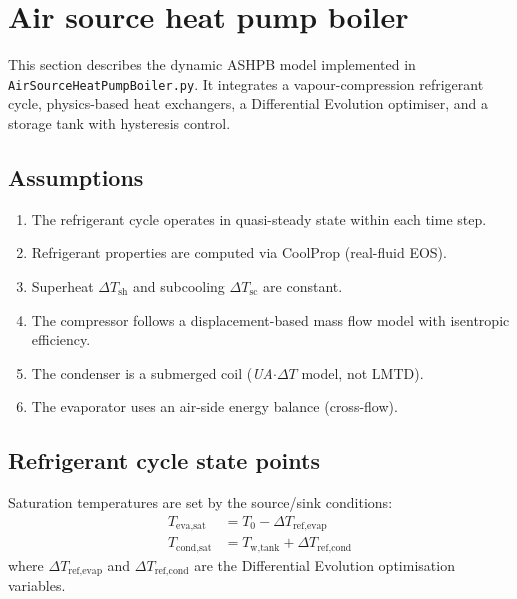 \section{Air source heat pump boiler}
\label{sec:ashpb}

This section describes the dynamic ASHPB model implemented in \texttt{AirSourceHeatPumpBoiler.py}. It integrates a vapour-compression refrigerant cycle, physics-based heat exchangers, a Differential Evolution optimiser, and a storage tank with hysteresis control.

\subsection{Assumptions}
\begin{enumerate}
  \item The refrigerant cycle operates in quasi-steady state within each time step.
  \item Refrigerant properties are computed via CoolProp (real-fluid EOS).
  \item Superheat $\Delta T_\text{sh}$ and subcooling $\Delta T_\text{sc}$ are constant.
  \item The compressor follows a displacement-based mass flow model with isentropic efficiency.
  \item The condenser is a submerged coil (\emph{UA}$\cdot\Delta T$ model, not LMTD).
  \item The evaporator uses an air-side energy balance (cross-flow).
\end{enumerate}

\subsection{Refrigerant cycle state points}

Saturation temperatures are set by the source/sink conditions:
\begin{align}
  T_\text{eva,sat} &= T_0 - \Delta T_\text{ref,evap}  \label{eq:ashp-Teva}\\
  T_\text{cond,sat} &= T_\text{w,tank} + \Delta T_\text{ref,cond} \label{eq:ashp-Tcond}
\end{align}
where $\Delta T_\text{ref,evap}$ and $\Delta T_\text{ref,cond}$ are the Differential Evolution optimisation variables.

